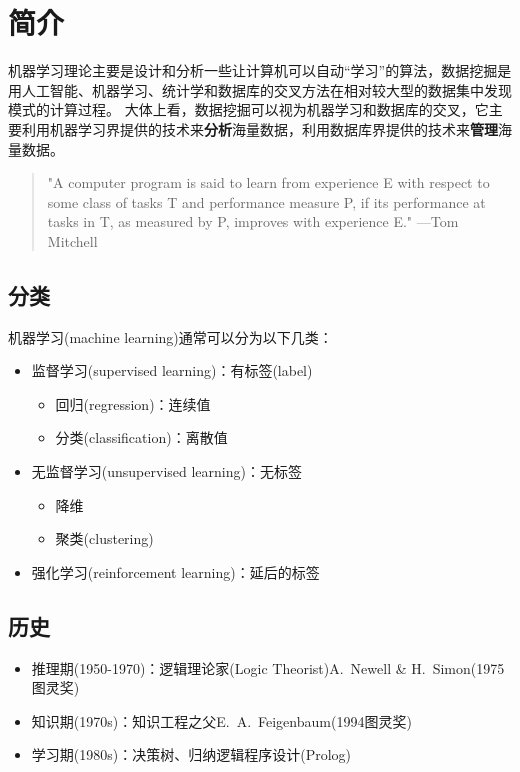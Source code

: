 
\section{简介}
机器学习理论主要是设计和分析一些让计算机可以自动“学习”的算法，数据挖掘是用人工智能、机器学习、统计学和数据库的交叉方法在相对较大型的数据集中发现模式的计算过程。 
大体上看，数据挖掘可以视为机器学习和数据库的交叉，它主要利用机器学习界提供的技术来\textbf{分析}海量数据，利用数据库界提供的技术来\textbf{管理}海量数据。

\begin{quote}
"A computer program is said to learn from experience E with respect to some class of tasks T and performance measure P, if its performance  at tasks in T, as measured by P, improves with experience E."
\hfill---Tom Mitchell
\end{quote}

\subsection{分类}
机器学习(machine learning)通常可以分为以下几类：
\begin{itemize}
	\item 监督学习(supervised learning)：有标签(label)
	\begin{itemize}
		\item 回归(regression)：连续值
		\item 分类(classification)：离散值
	\end{itemize}
	\item 无监督学习(unsupervised learning)：无标签
	\begin{itemize}
		\item 降维
		\item 聚类(clustering)
	\end{itemize}
	\item 强化学习(reinforcement learning)：延后的标签
\end{itemize}

\subsection{历史}
\begin{itemize}
	\item 推理期(1950-1970)：逻辑理论家(Logic Theorist)A.~Newell \& H.~Simon(1975图灵奖)
	\item 知识期(1970s)：知识工程之父E.~A.~Feigenbaum(1994图灵奖)
	\item 学习期(1980s)：决策树、归纳逻辑程序设计(Prolog)
\end{itemize}

